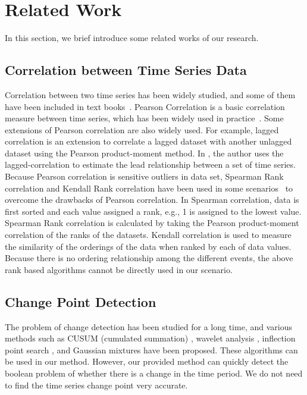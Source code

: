 \section{Related Work}
\label{sec:relatedwork}
In this section, we brief introduce some related works of our research.

\subsection{Correlation between Time Series Data}
Correlation between two time series has been widely studied, and some of them have been included in text books~\cite{johnson2002applied}. Pearson Correlation \cite{nagelkerke1991note} is a basic correlation measure between time series, which has been widely used in practice~\cite{Zhu:VLDB:2002}. Some extensions of Pearson correlation are also widely used. For example, lagged correlation is an extension to correlate a lagged dataset with another unlagged dataset using the Pearson product-moment method. In \cite{wu2010detecting}, the author uses the lagged-correlation to estimate the lead relationship between a set of time series. Because Pearson correlation is sensitive outliers in data set, Spearman Rank correlation and Kendall Rank correlation have been used in some scenarios~\cite{Lehman:SAS:2005} to overcome the drawbacks of Pearson correlation. In Spearman correlation, data is first sorted and each value assigned a rank, e.g., 1 is assigned to the lowest value. Spearman Rank correlation is calculated by taking the Pearson product-moment correlation of the ranks of the datasets. Kendall correlation is used to measure the similarity of the orderings of the data when ranked by each of data values. Because there is no ordering relationship among the different events, the above rank based algorithms cannot be directly used in our scenario.

\subsection{Change Point Detection}

The problem of change detection has been studied for a long time, and various methods such as CUSUM (cumulated summation) \cite{basseville1993detection}, wavelet analysis \cite{kadambe1992application}, inflection point search \cite{hirano2002mining}, and Gaussian mixtures \cite{yamanishi2002unifying} have been proposed. These algorithms can be used in our method. However, our provided method can quickly detect the boolean problem of whether there is a change in the time period. We do not need to find the time series change point very accurate.